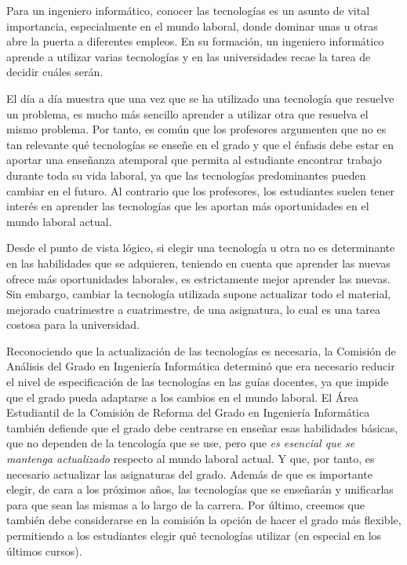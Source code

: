 Para un ingeniero informático,
conocer las tecnologías es un asunto de vital importancia,
especialmente en el mundo laboral,
donde dominar unas u otras abre la puerta a diferentes empleos.
En su formación,
un ingeniero informático aprende a utilizar varias tecnologías
y en las universidades recae la tarea de decidir cuáles serán.

El día a día muestra que
una vez que se ha utilizado una tecnología que resuelve un problema,
es mucho más sencillo aprender a utilizar otra que resuelva el mismo problema.
Por tanto, es común que los profesores argumenten que
no es tan relevante qué tecnologías se enseñe en el grado y
que el énfasis debe estar en aportar una enseñanza atemporal
que permita al estudiante encontrar trabajo durante toda su vida laboral,
ya que las tecnologías predominantes pueden cambiar en el futuro.
Al contrario que los profesores,
los estudiantes suelen tener interés en aprender las tecnologías que
les aportan más oportunidades en el mundo laboral actual.

Desde el punto de vista lógico,
si elegir una tecnología u otra no es determinante
en las habilidades que se adquieren,
teniendo en cuenta que aprender las nuevas ofrece más oportunidades laborales,
es estrictamente mejor aprender las nuevas.
Sin embargo, cambiar la tecnología utilizada
supone actualizar todo el material,
mejorado cuatrimestre a cuatrimestre,
de una asignatura,
lo cual es una tarea costosa para la universidad.

Reconociendo que la actualización de las tecnologías es necesaria,
la Comisión de Análisis del Grado en Ingeniería Informática
determinó que era necesario
reducir el nivel de especificación de las tecnologías en las guías docentes,
ya que impide que el grado pueda adaptarse a los cambios en el mundo laboral.
El Área Estudiantil de
la Comisión de Reforma del Grado en Ingeniería Informática
también defiende que
el grado debe centrarse en enseñar esas habilidades básicas,
que no dependen de la tencología que se use,
pero que \emph{es esencial que se mantenga actualizado}
respecto al mundo laboral actual.
Y que, por tanto, es necesario actualizar las asignaturas del grado.
Además de que es importante elegir, de cara a los próximos años,
las tecnologías que se enseñarán y unificarlas para que
sean las mismas a lo largo de la carrera.
Por último, creemos que también debe considerarse en la comisión
la opción de hacer el grado más flexible,
permitiendo a los estudiantes elegir qué tecnologías utilizar
(en especial en los últimos cursos).

